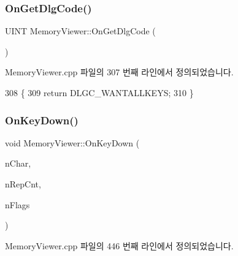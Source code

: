 \subsubsection{\texorpdfstring{On\+Get\+Dlg\+Code()}{OnGetDlgCode()}}
{\footnotesize\ttfamily U\+I\+NT Memory\+Viewer\+::\+On\+Get\+Dlg\+Code (\begin{DoxyParamCaption}{ }\end{DoxyParamCaption})\hspace{0.3cm}{\ttfamily [protected]}}



Memory\+Viewer.\+cpp 파일의 307 번째 라인에서 정의되었습니다.


\begin{DoxyCode}
308 \{
309   \textcolor{keywordflow}{return} DLGC\_WANTALLKEYS;
310 \}
\end{DoxyCode}
\mbox{\label{class_memory_viewer_afc4781b16d21212f67e5dd299c537718}} 
\subsubsection{\texorpdfstring{On\+Key\+Down()}{OnKeyDown()}}
{\footnotesize\ttfamily void Memory\+Viewer\+::\+On\+Key\+Down (\begin{DoxyParamCaption}\item[{U\+I\+NT}]{n\+Char,  }\item[{U\+I\+NT}]{n\+Rep\+Cnt,  }\item[{U\+I\+NT}]{n\+Flags }\end{DoxyParamCaption})\hspace{0.3cm}{\ttfamily [protected]}}



Memory\+Viewer.\+cpp 파일의 446 번째 라인에서 정의되었습니다.


